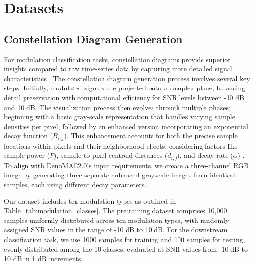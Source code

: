 \section{Datasets}

\subsection{Constellation Diagram Generation}

For modulation classification tasks, constellation diagrams provide superior insights compared to raw time-series data by capturing more detailed signal characteristics \cite{doan2020learning}. The constellation diagram generation process involves several key steps. Initially, modulated signals are projected onto a complex plane, balancing detail preservation with computational efficiency for SNR levels between -10 dB and 10 dB. The visualization process then evolves through multiple phases: beginning with a basic gray-scale representation that handles varying sample densities per pixel, followed by an enhanced version incorporating an exponential decay function ($B_{i,j}$). This enhancement accounts for both the precise sample locations within pixels and their neighborhood effects, considering factors like sample power ($P$), sample-to-pixel centroid distances ($d_{i,j}$), and decay rate ($\alpha$) \cite{peng2018modulation}. To align with DenoMAE2.0's input requirements, we create a three-channel RGB image by generating three separate enhanced grayscale images from identical samples, each using different decay parameters.

Our dataset includes ten modulation types as outlined in Table~\ref{tab:modulation_classes}. The pretraining dataset comprises 10,000 samples uniformly distributed across ten modulation types, with randomly assigned SNR values in the range of -10 dB to 10 dB. For the downstream classification task, we use 1000 samples for training and 100 samples for testing, evenly distributed among the 10 classes, evaluated at SNR values from -10 dB to 10 dB in 1 dB increments.

